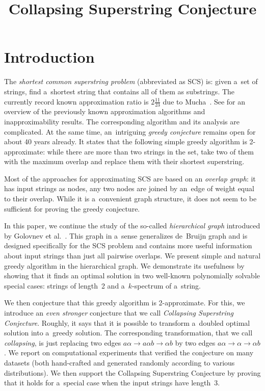 \documentclass[11pt,letterpaper]{article}
\begin{document}

\sloppy
\author{}
\date{}
\title{Collapsing Superstring Conjecture}
\maketitle
\tableofcontents

\section{Introduction}
The {\em shortest common superstring problem} (abbreviated as SCS) is:
given a~set of strings, find a~shortest string that contains all of them as
substrings. The currently record known approximation ratio is 
$2\frac{11}{23}$ due to Mucha~\cite{}. See \cite[Section~2.1]{GKM13} for an overview of the 
previously known approximation algorithms
and inapproximability results. 
The corresponding algorithm and its analysis are complicated.
At the same time, an~intriguing {\em greedy conjecture} remains open
for about 40 years already. It states that the following simple 
greedy algorithm is 2-approximate: while there are more than two strings 
in the set, take two of them with the maximum overlap and replace them
with their shortest superstring.

Most of the approaches for approximating SCS are based on an
{\em overlap graph}: it has input strings as nodes, any two nodes 
are joined by an~edge of weight equal to their overlap.  
While it is a~convenient graph structure, it does not seem to be sufficient
for proving the greedy conjecture.

In this paper, we continue the study of the so-called {\em hierarchical graph}
introduced by Golovnev et al.~\cite{}. This graph in a~sense generalizes de~Bruijn graph and is designed specifically 
for the SCS problem and contains more useful information about input strings
than just all pairwise overlaps. We present simple and natural greedy algorithm
in the hierarchical graph. 
We demonstrate its usefulness by showing that it finds an optimal solution 
in two well-known polynomially solvable special cases: strings of length~2 and
a~$k$-spectrum of a~string.

We then conjecture that this greedy algorithm is 2-approximate. For this, we introduce an {\em even stronger} conjecture that we call 
{\em Collapsing Superstring Conjecture}. 
Roughly, it says that it is possible to transform a~doubled optimal 
solution into a~greedy solution. 
The corresponding transformation, that we call {\em collapsing}, 
is just replacing two edges $a\alpha \to a\alpha b \to \alpha b$ 
by two edges $a\alpha \to \alpha \to \alpha b$. 
We report on computational experiments that verified the 
conjecture on many datasets (both hand-crafted and generated randomly
according to various distributions). 
We then support the Collapsing Superstring Conjecture by 
proving that it holds for a~special case when the input strings have length~3.
\end{document}
